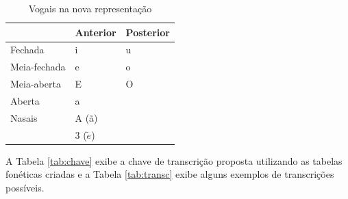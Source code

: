 \begin{center}
\begin{table}[H]
\begin{center}
    \begin{tabular}{lll}
        \hline
         & Anterior & Posterior \\
         \hline
        Fechada & i & u \\
        \hline
        Meia-fechada & e & o \\
        \hline
        Meia-aberta & E & O \\
        \hline
        Aberta & a &  \\
        \hline
        Nasais & A (ã) &\\ & 3 ($\tilde{e}$) &\\ 
        \hline
    \end{tabular}
\end{center}
\caption{Vogais na nova representação}
\label{tab:new_vocals}
\end{table}
\end{center}

  A Tabela \ref{tab:chave} exibe a chave de transcrição proposta utilizando as tabelas  fonéticas criadas e a Tabela \ref{tab:transc} exibe alguns exemplos de transcrições possíveis.  


